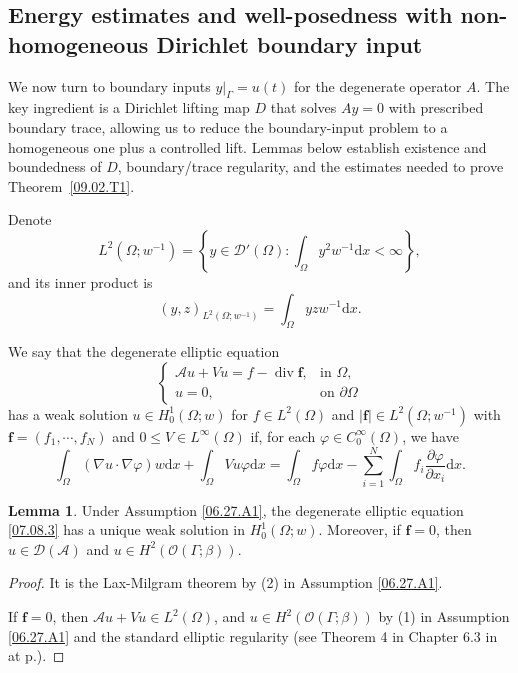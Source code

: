 \documentclass[preprint,12pt]{elsarticle}
\theoremstyle{definition}   %
\newtheorem{lemma}[theorem]{Lemma}
\numberwithin{equation}{section}
\def\pt{\partial}
\def\bs{\boldsymbol}
\def\ms{\mathscr}
\def\vp{\varphi}
\def\pt{\partial}
\def\Om{\Omega}
\def\be{\beta}
\def\Ga{\Gamma}
\def\iy{\infty}
\def\f{\frac}
\def\df{\mathrm d}
\def\mcO{\mathcal{O}}
\def\mcA{\mathcal{A}}
\def\mcD{\mathcal{D}}
\DeclareMathOperator{\Div}{div}
\begin{document}
\subsection{Energy estimates and well-posedness with non-homogeneous Dirichlet boundary input}

We now turn to boundary inputs $y|_{\Gamma}=u(t)$ for the degenerate operator $A$. The key ingredient is a Dirichlet lifting map $D$ that solves $Ay=0$ with prescribed boundary trace, allowing us to reduce the boundary-input problem to a homogeneous one plus a controlled lift. Lemmas below establish existence and boundedness of $D$, boundary/trace regularity, and the estimates needed to prove Theorem~\ref{09.02.T1}.

Denote 
\begin{equation*}
	L^2(\Om;w^{-1})=\left\{y\in \ms{D}'(\Om)\colon \int_\Om y^2w^{-1}\df x<\iy\right\}, 
\end{equation*}
and its inner product is 
\begin{equation*}
	(y,z)_{L^2(\Om;w^{-1})}=\int_\Om yz w^{-1}\df x. 
\end{equation*}


We say that the degenerate elliptic equation 
\begin{equation}\label{07.08.3}
	\begin{cases}
		\mcA u+Vu=f-\Div \bs{f}, &\mbox{in }\Om,\\ 
		u=0, &\mbox{on }\pt\Om 
	\end{cases}
\end{equation}
has a weak solution $u\in H_0^1(\Om;w)$ for $f\in L^2(\Om)$ and $|\bs{f}|\in L^2(\Om;w^{-1})$ with $\bs{f}=(f_1,\cdots, f_N)$ and $0\leq V\in L^\iy(\Om)$ if, for each $\vp\in C_0^\iy(\Om)$, we have
\begin{equation*}
	\int_\Om (\nabla u\cdot \nabla\vp)w\df x+\int_\Om V u\vp\df x=\int_\Om f\vp\df x-\sum_{i=1}^N \int_\Om f_i\f{\pt\vp}{\pt x_i}\df x. 
\end{equation*}

\begin{lemma}\label{07.08.L1'}\label{07.08.L1}
	Under Assumption \ref{06.27.A1}, the degenerate elliptic equation \eqref{07.08.3} has a unique weak solution in $H_0^1(\Om;w)$. Moreover, if $\bs{f}=0$, then $u\in \mcD(\mcA)$ and $u\in H^2(\mcO(\Ga;\be))$. 
\end{lemma}

\begin{proof}
	It is the Lax-Milgram theorem by (2) in Assumption \ref{06.27.A1}. 
	
	
	If $\bs{f}=0$, then $\mcA u+Vu\in L^2(\Om)$, and $u\in H^2(\mcO(\Ga;\be))$ by (1) in Assumption \ref{06.27.A1} and the standard elliptic regularity (see Theorem 4 in Chapter 6.3 in \cite{Evans} at p.).
\end{proof}
\end{document}

